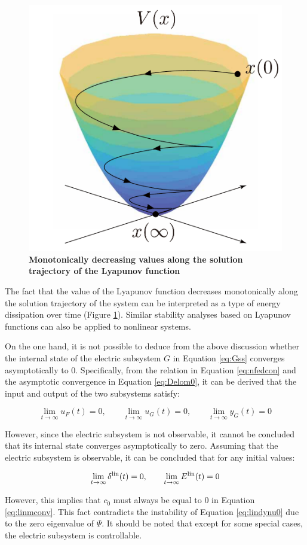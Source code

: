 \documentclass[graybox, envcountchap]{svmult}
\begin{document}
\begin{COLUMN}
\begin{figure}[h]
  \centering
  \includegraphics[width = .35\linewidth]{figs/cone}
  \caption{\textbf{Monotonically decreasing values along the solution trajectory of the Lyapunov function}}
  \label{fig:conelyap}
  \medskip
\end{figure}

The fact that the value of the Lyapunov function decreases monotonically along
the solution trajectory of the system can be interpreted as a type of energy
dissipation over time (Figure \ref{fig:conelyap}). Similar stability analyses
based on Lyapunov functions can also be applied to nonlinear systems.

\end{COLUMN}

On the one hand, it is not possible to deduce from the above discussion whether
the internal state of the electric subsystem $G$ in Equation \ref{eq:Gss}
converges asymptotically to 0.  Specifically, from the relation in Equation
\ref{eq:nfedcon} and the asymptotic convergence in Equation \ref{eq:Delom0}, it
can be derived that the input and output of the two subsystems satisfy:

\[
  \lim_{t\rightarrow \infty} u_F(t)  =0,\qquad
  \lim_{t\rightarrow \infty} u_G(t)  =0,\qquad
  \lim_{t\rightarrow \infty} y_G(t)  =0
\]

However, since the electric subsystem is not observable, it cannot be concluded
that its internal state converges asymptotically to zero.  Assuming that the
electric subsystem is observable, it can be concluded that for any initial
values:

\[
  \lim_{t\rightarrow \infty}  \delta^{\rm lin}(t)  =0,\qquad
  \lim_{t\rightarrow \infty}  E^{\rm lin}(t)  =0
\]

However, this implies that $c_0$ must always be equal to 0 in Equation
\ref{eq:linmconv}. This fact contradicts the instability of Equation
\ref{eq:lindynu0} due to the zero eigenvalue of $\Psi$. It should be noted that
except for some special cases, the electric subsystem is controllable.
\end{document}
